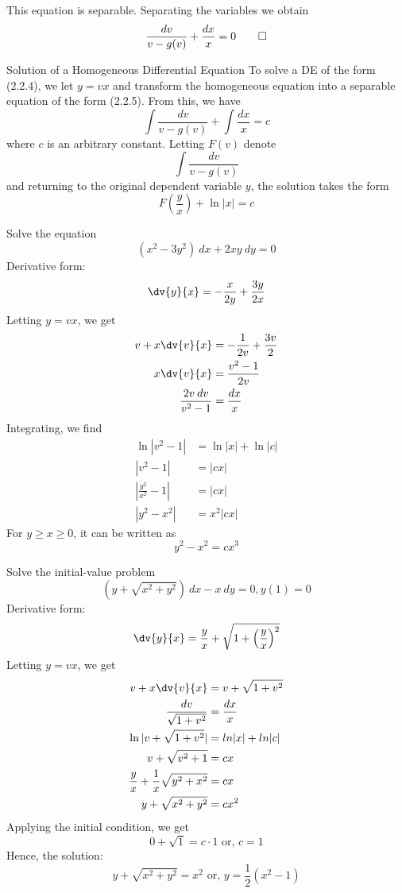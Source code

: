 This equation is separable. Separating the variables we obtain
\begin{equation}
    \frac{d{v}}{v - g(v)} + \frac{d{x}}{x} = 0 \qed
\end{equation}

\begin{theorem}{Solution of a Homogeneous Differential Equation}{}
    To solve a DE of the form (2.2.4), we let $y = vx$ and transform the homogeneous equation into a separable equation of the form (2.2.5). From this, we have \[
        \int{\frac{dv}{v - g(v)}} + \int{\frac{dx}{x}} = c
    \] where $c$ is an arbitrary constant. Letting $F(v)$ denote \[
        \int{\frac{dv}{v - g(v)}}
    \] and returning to the original dependent variable $y$, the solution takes the form \[
        F\left( \frac{y}{x} \right) + \ln|x| = c
    \]
\end{theorem}

\begin{example}{Solve the equation \[
        (x^2 - 3y^2) \: d{x} + 2xy \: d{y} = 0
\]}{}
    Derivative form: \[
        \dv{y}{x} = - \frac{x}{2y} + \frac{3y}{2x}
    \] Letting $y = vx$, we get
    \begin{align*}
        v + x\dv{v}{x} &= -\frac{1}{2v} + \frac{3v}{2} \\
        x\dv{v}{x} &= \frac{v^2-1}{2v} \\
        \frac{2v \: dv}{v^2-1} &= \frac{dx}{x}
    \end{align*}
    Integrating, we find
    \begin{align*}
        \ln|v^2 - 1| &= \ln|x| + \ln|c| \\
        |v^2 - 1| &= |cx| \\
        |\frac{y^2}{x^2} - 1| &= |cx| \\
        |y^2 - x^2| &= x^2|cx|
    \end{align*}
    For $y \ge x \ge 0$, it can be written as \[
        \boxed{y^2 - x^2 = cx^3}
    \]
\end{example}

\begin{example}{Solve the initial-value problem \[
        (y + \sqrt{x^2 + y^2}) \: d{x} - x \: d{y} = 0, y(1) = 0
\]}{}
    Derivative form: \[
        \dv{y}{x} = \frac{y}{x} + \sqrt{1 + \left( \frac{y}{x} \right)^2}
    \] Letting $y = vx$, we get
    \begin{align*}
        v + x\dv{v}{x} &= v + \sqrt{1 + v^2} \\
        \frac{dv}{\sqrt{1+v^2}} &= \frac{dx}{x} \\
        \ln|v + \sqrt{1+v^2}| &= ln|x|+ln|c| \\
        v + \sqrt{v^2 + 1} &= cx \\
        \frac{y}{x} + \frac{1}{x}\sqrt{y^2 + x^2} &= cx \\
        y + \sqrt{x^2 + y^2} &=  cx^2 \\
    \end{align*}
    Applying the initial condition, we get \[
        0 + \sqrt{1} = c \cdot 1 \text{ or, } c = 1
    \] Hence, the solution: \[
        \boxed{ y + \sqrt{x^2 + y^2} = x^2 } \text{ or, } \boxed{y = \frac{1}{2}(x^2 - 1)}
    \]
\end{example}

